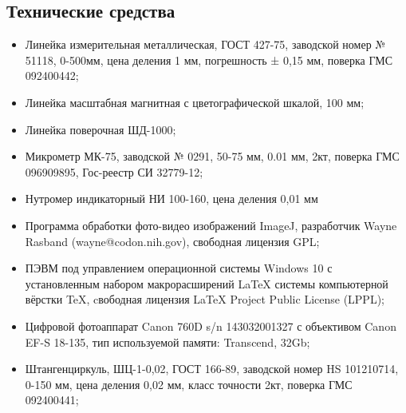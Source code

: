 \subsection{Технические средства}  %
\begin{itemize}
%    
\item 	
Линейка измерительная металлическая, ГОСТ 427-75, заводской номер № 51118, 0-500мм, цена деления 1 мм, погрешность ± 0,15 мм, поверка ГМС 092400442;
\item 	
Линейка масштабная магнитная с цветографической шкалой, 100 мм;
\item   Линейка поверочная ШД-1000;
\item 	
Микрометр МК-75, заводской № 0291, 50-75 мм, 0.01 мм, 2кт, поверка ГМС 096909895, Гос-реестр СИ 32779-12;
\item 	
Нутромер индикаторный НИ 100-160, цена деления 0,01 мм
\item   
Программа обработки фото-видео изображений ImageJ, разработчик  Wayne Rasband (wayne@codon.nih.gov),
свободная лицензия GPL;
\item   
ПЭВМ под управлением операционной системы Windows 10 с установленным набором макрорасширений LaTeX системы компьютерной вёрстки TeX, cвободная лицензия LaTeX Project Public License (LPPL);
\item 	
Цифровой фотоаппарат Canon 760D s/n 143032001327 с объективом Canon EF-S 18-135, тип используемой памяти: Transcend,  32Gb;
\item 	
Штангенциркуль, ШЦ-1-0,02, ГОСТ 166-89, заводской номер HS 101210714, 0-150 мм, цена деления 0,02 мм, класс точности 2кт, поверка ГМС 092400441;

\end{itemize}
